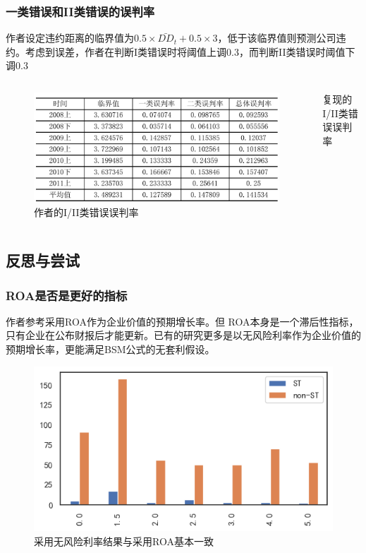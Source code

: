 \documentclass{ctexbeamer}
\begin{document}
\begin{frame}
    \frametitle{一类错误和II类错误的误判率}

    作者设定违约距离的临界值为$0.5\times \bar{DD}_t+0.5\times 3$，低于该临界值则预测公司违约。考虑到误差，作者在判断I类错误时将阈值上调0.3，而判断II类错误时阈值下调0.3

    \begin{columns}
        \begin{figure}[H]
            \includegraphics[width=\linewidth]{img/tab1.jpeg}
            \caption{作者的I/II类错误误判率}
        \end{figure}
        \begin{table}[H]
            \centering
            
            \caption{复现的I/II类错误误判率}
        \end{table}
    \end{columns}
\end{frame}


\subsection{反思与尝试}
\begin{frame}
    \frametitle{ROA是否是更好的指标}
    作者参考\citet{夏红芳2007基于}采用ROA作为企业价值的预期增长率。但 ROA本身是一个滞后性指标，只有企业在公布财报后才能更新。已有的研究更多是以无风险利率作为企业价值的预期增长率，更能满足BSM公式的无套利假设。
    \begin{figure}
        \includegraphics[width=0.8\linewidth]{fig/output.png}
        \caption{采用无风险利率结果与采用ROA基本一致}
    \end{figure}
\end{frame}
\end{document}
